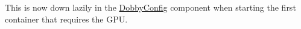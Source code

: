 
\begin{DoxyRefList}
\item[Member \mbox{\hyperlink{classDobbyTemplate_aae841eb57fd57714786e0bbab39f851c}{Dobby\+Template\+::set\+Template\+Dev\+Nodes}} (const std\+::list$<$ std\+::string $>$ \&dev\+Nodes)]\label{deprecated__deprecated000001}%
%
This is now down lazily in the \mbox{\hyperlink{classDobbyConfig}{Dobby\+Config}} component when starting the first container that requires the GPU.
\end{DoxyRefList}